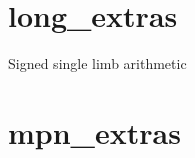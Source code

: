 \documentclass[a4paper,10pt]{book}
\begin{document}



\chapter{long\_extras}
\epigraph{Signed single limb arithmetic}{}




\chapter{mpn\_extras}




\backmatter

{}


\end{document}
